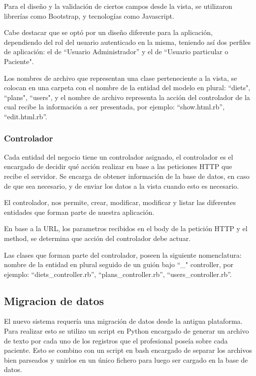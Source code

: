 \documentclass[runningheads,a4paper,spanish]{llncs}
\begin{document}
Para el diseño y la validación de ciertos campos desde la vista, se utilizaron librerías como Bootstrap, y tecnologías como Javascript.

Cabe destacar que se optó por un diseño diferente para la aplicación, dependiendo del rol del usuario autenticado en la misma,  teniendo así dos perfiles de aplicación: el de “Usuario Administrador” y el de “Usuario particular o Paciente".

Los nombres de archivo que representan una clase perteneciente a la vista, se colocan en una carpeta con el nombre de la entidad del modelo en plural: “diets", “plans", “users", y el nombre de archivo representa la acción del controlador de la cual recibe la información a ser presentada, por ejemplo: "`show.html.rb"', "`edit.html.rb"'.

\subsubsection{Controlador}

Cada entidad del negocio tiene un controlador asignado, el controlador es el encargado de decidir qué acción realizar en base a las peticiones HTTP que recibe el servidor.  Se encarga de obtener información de la base de datos, en caso de que sea necesario, y de enviar los datos a la vista cuando esto es necesario.

El controlador, nos permite, crear, modificar, modificar y listar las diferentes entidades que forman parte de nuestra aplicación.

En base a la URL, los parametros recibidos en el body de la petición HTTP y el method, se determina que acción del controlador debe actuar.

Las clases que forman parte del controlador, poseen la siguiente nomenclatura: nombre de la entidad en plural seguido de un guión bajo “\_" controller, por ejemplo: "`diets\_controller.rb"', "`plans\_controller.rb"', "`users\_controller.rb"'.


\subsection{Migracion de datos}
El nuevo sistema requería una migración de datos desde la antigua plataforma. Para realizar esto se utilizo un script en Python encargado de generar un archivo de texto por cada uno de los registros que el profesional poseía sobre cada paciente. Esto se combino con un script en bash encargado de separar los archivos bien parseados y unirlos en un único fichero para luego ser cargado en la base de datos.
\end{document}
